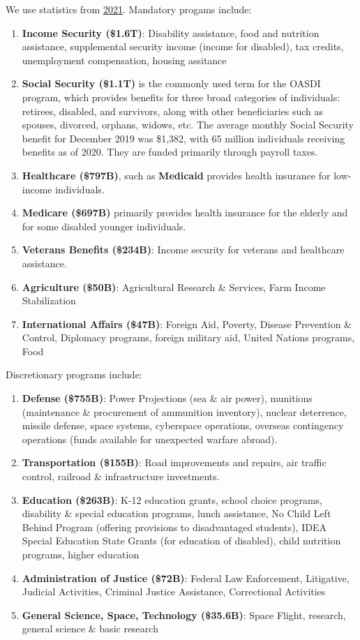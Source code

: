 \documentclass{article}
\begin{document}
    We use statistics from \href{https://datalab.usaspending.gov/americas-finance-guide/spending/categories/}{2021}.
    Mandatory progams include:
    \begin{enumerate}
      \item \textbf{Income Security (\$1.6T)}: Disability assistance, food and nutrition assistance, supplemental security income (income for disabled), tax credits, unemployment compensation, housing assitance
      \item \textbf{Social Security (\$1.1T)} is the commonly used term for the OASDI program, which provides benefits for three broad categories of individuals: retirees, disabled, and survivors, along with other beneficiaries such as spouses, divorced, orphans, widows, etc. The average monthly Social Security benefit for December 2019 was \$1,382, with 65 million individuals receiving benefits as of 2020. They are funded primarily through payroll taxes.
      \item \textbf{Healthcare (\$797B)}, such as \textbf{Medicaid} provides health insurance for low-income individuals.
      \item \textbf{Medicare (\$697B)} primarily provides health insurance for the elderly and for some disabled younger individuals.
      \item \textbf{Veterans Benefits (\$234B)}: Income security for veterans and healthcare assistance.
      \item \textbf{Agriculture (\$50B)}: Agricultural Research \& Services, Farm Income Stabilization
      \item \textbf{International Affairs (\$47B)}: Foreign Aid, Poverty, Disease Prevention \& Control, Diplomacy programs, foreign military aid, United Nations programs, Food
    \end{enumerate}
    Discretionary programs include:
    \begin{enumerate}
      \item \textbf{Defense (\$755B)}: Power Projections (sea \& air power), munitions (maintenance \& procurement of ammunition inventory), nuclear deterrence, missile defense, space systems, cyberspace operations, overseas contingency operations (funds available for unexpected warfare abroad).
      \item \textbf{Transportation (\$155B)}: Road improvements and repairs, air traffic control, railroad \& infrastructure investments.
      \item \textbf{Education (\$263B)}: K-12 education grants, school choice programs, disability \& special education programs, lunch assistance, No Child Left Behind Program (offering provisions to disadvantaged students), IDEA Special Education State Grants (for education of disabled), child nutrition programs, higher education
      \item \textbf{Administration of Justice (\$72B)}: Federal Law Enforcement, Litigative, Judicial Activities, Criminal Justice Assistance, Correctional Activities
      \item \textbf{General Science, Space, Technology (\$35.6B)}: Space Flight, research, general science \& basic research
    \end{enumerate}
\end{document}
